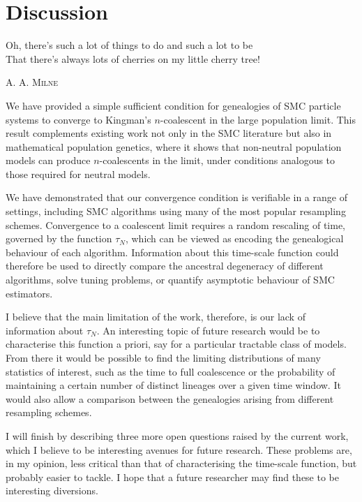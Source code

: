 \chapter{Discussion}

\epigraph{
Oh, there's such a lot of things to do and such a lot to be\\
That there's always lots of cherries on my little cherry tree!
}
{\textsc{A. A. Milne}}

We have provided a simple sufficient condition for genealogies of SMC particle systems to converge to Kingman's $n$-coalescent in the large population limit. 
This result complements existing work not only in the SMC literature but also in mathematical population genetics, where it shows that non-neutral population models can produce $n$-coalescents in the limit, under conditions analogous to those required for neutral models.

We have demonstrated that our convergence condition is verifiable in a range of settings, including SMC algorithms using many of the most popular resampling schemes. 
Convergence to a coalescent limit requires a random rescaling of time, governed by the function $\tau_N$, which can be viewed as encoding the genealogical behaviour of each algorithm.
Information about this time-scale function could therefore be used to directly compare the ancestral degeneracy of different algorithms, solve tuning problems, or quantify asymptotic behaviour of SMC estimators.

I believe that the main limitation of the work, therefore, is our lack of information about $\tau_N$. An interesting topic of future research would be to characterise this function a priori, say for a particular tractable class of models.
From there it would be possible to find the limiting distributions of many statistics of interest, such as the time to full coalescence or the probability of maintaining a certain number of distinct lineages over a given time window. It would also allow a comparison between the genealogies arising from different resampling schemes.

I will finish by describing three more open questions raised by the current work, which I believe to be interesting avenues for future research. These problems are, in my opinion, less critical than that of characterising the time-scale function, but probably easier to tackle. 
I hope that a future researcher may find these to be interesting diversions.

